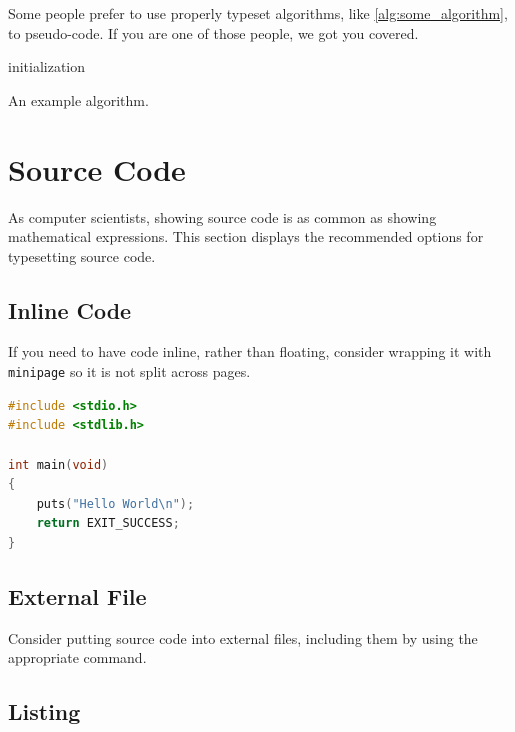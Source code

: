 Some people prefer to use properly typeset algorithms, like \cref{alg:some_algorithm}, to pseudo-code.
If you are one of those people, we got you covered.

\begin{algorithm}
	\capstart
	\BlankLine
	initialization\;
	\caption{An example algorithm.}
	\label{alg:some_algorithm}
\end{algorithm}

\section{Source Code}

As computer scientists, showing source code is as common as showing mathematical expressions.
This section displays the recommended options for typesetting source code.

\subsection{Inline Code}

If you need to have code inline, rather than floating, consider wrapping it with \texttt{minipage} so it is not split across pages.

\begin{minipage}{0.95\textwidth}
\begin{lstlisting}[language=c]
#include <stdio.h>
#include <stdlib.h>

int main(void)
{
	puts("Hello World\n");
	return EXIT_SUCCESS;
}
\end{lstlisting}
\end{minipage}

\subsection{External File}

Consider putting source code into external files, including them by using the appropriate command.

\begin{minipage}{0.95\textwidth}

\end{minipage}

\subsection{Listing}

